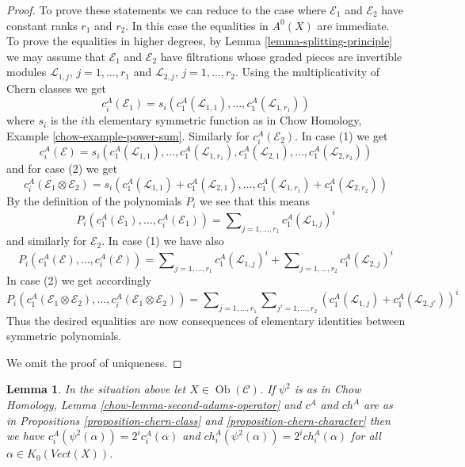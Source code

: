 \documentclass{stacks-project}
\theoremstyle{plain}
\newtheorem{lemma}[subsection]{Lemma}
\theoremstyle{definition}
\theoremstyle{remark}
\numberwithin{equation}{subsection}
\def\Ob{\mathop{\mathrm{Ob}}\nolimits}
\begin{document}
\begin{proof}
\medskip\noindent
To prove these statements we can reduce to the case where $\mathcal{E}_1$
and $\mathcal{E}_2$ have constant ranks $r_1$ and $r_2$. In this case the
equalities in $A^0(X)$ are immediate. To prove the equalities in higher
degrees, by Lemma \ref{lemma-splitting-principle} we may
assume that $\mathcal{E}_1$ and $\mathcal{E}_2$ have filtrations
whose graded pieces are invertible modules
$\mathcal{L}_{1, j}$, $j = 1, \ldots, r_1$ and
$\mathcal{L}_{2, j}$, $j = 1, \ldots, r_2$.
Using the multiplicativity of Chern classes we get
$$
c_i^A(\mathcal{E}_1) =
s_i(c_1^A(\mathcal{L}_{1, 1}), \ldots, c_1^A(\mathcal{L}_{1, r_1}))
$$
where $s_i$ is the $i$th elementary symmetric function as in
Chow Homology, Example \ref{chow-example-power-sum}.
Similarly for $c_i^A(\mathcal{E}_2)$. In case (1) we get
$$
c_i^A(\mathcal{E}) =
s_i(c_1^A(\mathcal{L}_{1, 1}), \ldots, c_1^A(\mathcal{L}_{1, r_1}),
c_1^A(\mathcal{L}_{2, 1}), \ldots, c_1^A(\mathcal{L}_{2, r_2}))
$$
and for case (2) we get
$$
c_i^A(\mathcal{E}_1 \otimes \mathcal{E}_2) =
s_i(c_1^A(\mathcal{L}_{1, 1}) + c_1^A(\mathcal{L}_{2, 1}),
\ldots, c_1^A(\mathcal{L}_{1, r_1}) + c_1^A(\mathcal{L}_{2, r_2}))
$$
By the definition of the polynomials $P_i$ we see that this means
$$
P_i(c^A_1(\mathcal{E}_1), \ldots, c^A_i(\mathcal{E}_1)) =
\sum\nolimits_{j = 1, \ldots, r_1} c_1^A(\mathcal{L}_{1, j})^i
$$
and similarly for $\mathcal{E}_2$. In case (1) we have also
$$
P_i(c^A_1(\mathcal{E}), \ldots, c^A_i(\mathcal{E})) =
\sum\nolimits_{j = 1, \ldots, r_1} c_1^A(\mathcal{L}_{1, j})^i +
\sum\nolimits_{j = 1, \ldots, r_2} c_1^A(\mathcal{L}_{2, j})^i
$$
In case (2) we get accordingly
$$
P_i(c^A_1(\mathcal{E}_1 \otimes \mathcal{E}_2), \ldots,
c^A_i(\mathcal{E}_1 \otimes \mathcal{E}_2)) =
\sum\nolimits_{j = 1, \ldots, r_1}
\sum\nolimits_{j' = 1, \ldots, r_2}
(c_1^A(\mathcal{L}_{1, j}) + c_1^A(\mathcal{L}_{2, j'}))^i
$$
Thus the desired equalities are now consequences of elementary
identities between symmetric polynomials.

\medskip\noindent
We omit the proof of uniqueness.
\end{proof}

\begin{lemma}
\label{lemma-adams-and-chern}
In the situation above let $X \in \Ob(\mathcal{C})$.
If $\psi^2$ is as in
Chow Homology, Lemma \ref{chow-lemma-second-adams-operator}
and $c^A$ and $ch^A$ are as in
Propositions \ref{proposition-chern-class} and
\ref{proposition-chern-character}
then we have $c^A_i(\psi^2(\alpha)) = 2^i c^A_i(\alpha)$ and
$ch^A_i(\psi^2(\alpha)) = 2^i ch^A_i(\alpha)$
for all $\alpha \in K_0(\textit{Vect}(X))$.
\end{lemma}
\end{document}
